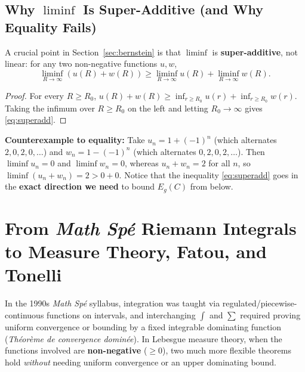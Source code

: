 \documentclass[11pt, a4paper]{article}
\theoremstyle{definition}
\theoremstyle{remark}
\begin{document}
\subsection{Why $\liminf$ Is Super-Additive (and Why Equality Fails)}
A crucial point in Section~\ref{sec:bernstein} is that $\liminf$ is \textbf{super-additive}, not linear: for any two non-negative functions $u, w$,
\begin{equation}
\label{eq:superadd}
\liminf_{R \to \infty} \left(u(R) + w(R)\right) \ge \liminf_{R \to \infty} u(R) + \liminf_{R \to \infty} w(R).
\end{equation}
\begin{proof}
For every $R \ge R_0$, $u(R) + w(R) \ge \inf_{r \ge R_0} u(r) + \inf_{r \ge R_0} w(r)$. Taking the infimum over $R \ge R_0$ on the left and letting $R_0 \to \infty$ gives \eqref{eq:superadd}.
\end{proof}
\noindent \textbf{Counterexample to equality:} Take $u_n = 1 + (-1)^n$ (which alternates $2, 0, 2, 0, \dots$) and $w_n = 1 - (-1)^n$ (which alternates $0, 2, 0, 2, \dots$). Then $\liminf u_n = 0$ and $\liminf w_n = 0$, whereas $u_n + w_n = 2$ for all $n$, so $\liminf(u_n + w_n) = 2 > 0 + 0$. Notice that the inequality \eqref{eq:superadd} goes in the \textbf{exact direction we need} to bound $E_g(C)$ from below.

\section{From \textit{Math Sp\'e} Riemann Integrals to Measure Theory, Fatou, and Tonelli}
\label{app:measure}

In the 1990s \textit{Math Sp\'e} syllabus, integration was taught via regulated/piecewise-continuous functions on intervals, and interchanging $\int$ and $\sum$ required proving uniform convergence or bounding by a fixed integrable dominating function (\textit{Th\'eor\`eme de convergence domin\'ee}). In Lebesgue measure theory, when the functions involved are \textbf{non-negative} ($\ge 0$), two much more flexible theorems hold \textit{without} needing uniform convergence or an upper dominating bound.
\end{document}
